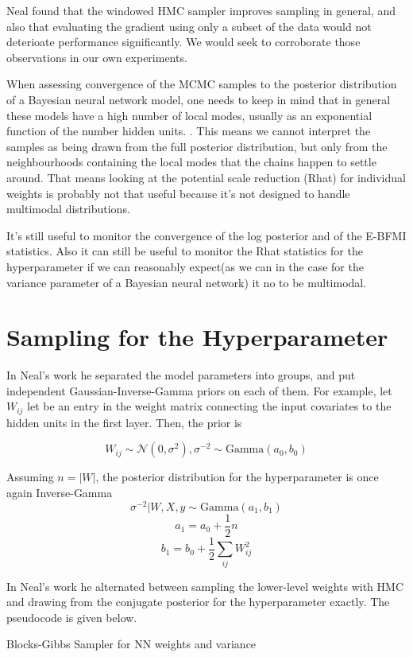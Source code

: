 \documentclass[12pt]{report}
\begin{document}
Neal found that the windowed HMC sampler improves sampling in general, and also that evaluating the gradient using only a subset of the data would not deterioate performance significantly. We would seek to corroborate those observations in our own experiments.

When assessing convergence of the MCMC samples to the posterior distribution of a Bayesian neural network model, one needs to keep in mind that in general these models have a high number of local modes, usually as an exponential function of the number hidden units. \cite{bishop1995neural}. This means we cannot interpret the samples as being drawn from the full posterior distribution, but only from the neighbourhoods containing the local modes that the chains happen to settle around. That means looking at the potential scale reduction (Rhat) for individual weights is probably not that useful because it's not designed to handle multimodal distributions.  

It's still useful to monitor the convergence of the log posterior and of the E-BFMI statistics. Also it can still be useful to monitor the Rhat statistics for the hyperparameter if we can reasonably expect(as we can in the case for the variance parameter of a Bayesian neural network) it no to be multimodal. 



\section{Sampling for the Hyperparameter}

In Neal's work he separated the model parameters into groups, and put independent Gaussian-Inverse-Gamma priors on each of them. For example, let $W_{ij}$ let be an entry in the weight matrix connecting the input covariates to the hidden units in the first layer. Then, the prior is 

\[W_{ij} \sim \mathcal{N}(0,\sigma^2), \sigma^{-2} \sim \text{Gamma}(a_0,b_0) \]

Assuming $n = |W|$, the posterior distribution for the hyperparameter is once again Inverse-Gamma
\[\sigma^{-2}|W,X,y \sim \text{Gamma}(a_1,b_1)\]
\[a_1 = a_0 + \frac{1}{2} n  \]
\[b_1 = b_0 + \frac{1}{2} \sum_{ij} W_{ij}^2 \]

In Neal's work he alternated between sampling the lower-level weights with HMC and drawing from the conjugate posterior for the hyperparameter exactly. The pseudocode is given below.
\begin{algorithm}

\caption{Blocks-Gibbs Sampler for NN weights and variance}
\end{algorithm}
\end{document}
